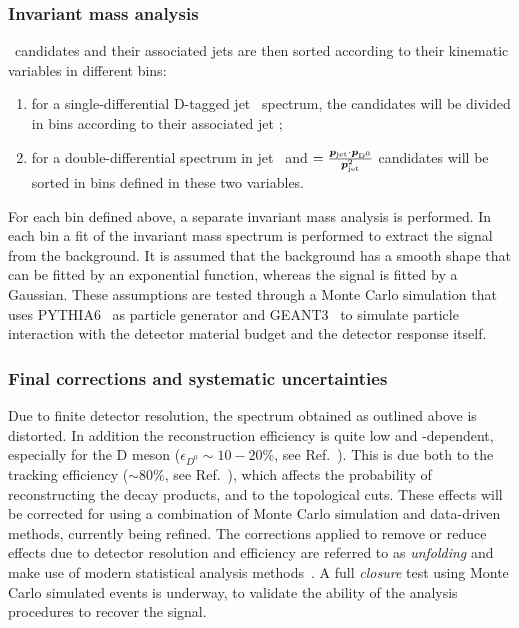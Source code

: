 \documentclass[a4paper]{jpconf}
\begin{document}
\subsubsection{Invariant mass analysis}
\Dzero\ candidates and their associated jets are then sorted according to their kinematic variables in different bins:
\begin{enumerate}
\item for a single-differential D-tagged jet \pT\ spectrum, the candidates will be divided in bins according to their associated jet \pT;
\item for a double-differential spectrum in jet \pT\ and \zpar$=\frac{\bm{p}_{\rm jet}\cdot{\bm{p}}_{\rm D^0}}{\bm{p}_{\rm jet}^2}$ candidates will
be sorted in bins defined in these two variables.
\end{enumerate}
For each bin defined above, a separate invariant mass analysis is performed. 
In each bin a fit of the invariant mass spectrum is performed to extract the signal from the background. It is assumed that the background has
a smooth shape that can be fitted by an exponential function, whereas the signal is fitted by a Gaussian. These assumptions are tested
through a Monte Carlo simulation that uses PYTHIA6~\cite{Sjostrand:2006} as particle generator and GEANT3~\cite{GEANT3-url} to simulate particle interaction
with the detector material budget and the detector response itself.

\subsubsection{Final corrections and systematic uncertainties}
Due to finite detector resolution, the spectrum obtained as outlined above is distorted. In addition the reconstruction efficiency is quite low
and \pT-dependent, especially for the D meson ($\epsilon_{D^0} \sim 10-20\%$, see Ref.~\cite{ALICE:2012d}). This is due both to the tracking efficiency ($\sim 80\%$, see Ref.~\cite{ALICE:2014b}),
which affects the probability of reconstructing the decay products, and to the topological cuts. These effects will be corrected for using a combination of Monte Carlo simulation and data-driven methods, currently being refined.
The corrections applied to remove or reduce effects due to detector resolution and efficiency are referred to as \emph{unfolding} and make use of modern statistical analysis methods~\cite{Hocker:1995, Dagostini:1995}.
A full \emph{closure} test using Monte Carlo simulated events is underway, to validate the ability of the analysis procedures to recover the signal.
\end{document}
